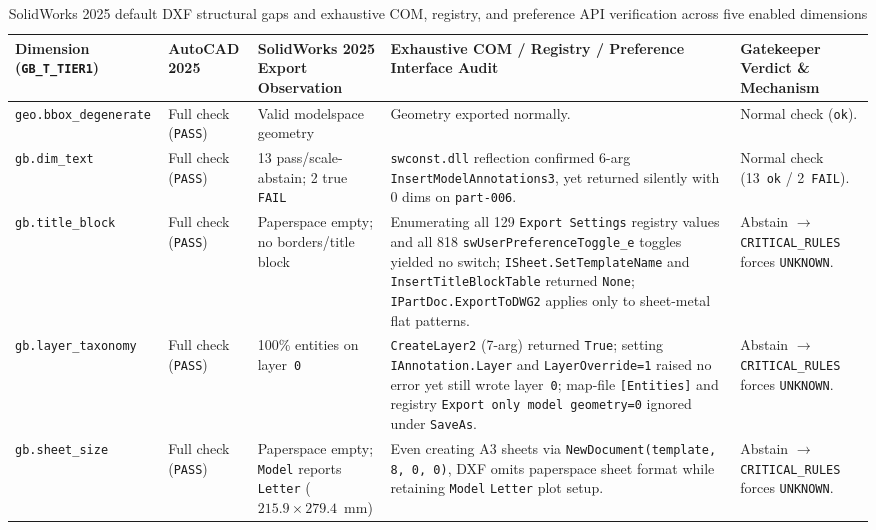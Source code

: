 \documentclass[nocopyright,nolists,upint,varvw,hyphenate]{asmejour}
\begin{document}
\begin{table}[t]
\caption{SolidWorks 2025 default DXF structural gaps and exhaustive COM, registry, and preference API verification across five enabled dimensions}\label{tab:supp_sw_audit}
\centering
\scriptsize
\setlength{\tabcolsep}{2.5pt}
%
\begin{tabularx}{\textwidth}{L{2.1cm} L{1.9cm} L{3.0cm} Y L{2.9cm}}
\toprule
Dimension (\texttt{GB\_T\_TIER1}) & AutoCAD 2025 & SolidWorks 2025 Export Observation & Exhaustive COM / Registry / Preference Interface Audit & Gatekeeper Verdict \& Mechanism \\
\midrule
\texttt{geo.bbox\_degenerate} & Full check (\texttt{PASS}) & Valid modelspace geometry & Geometry exported normally. & Normal check (\texttt{ok}). \\
\addlinespace[2pt]
\texttt{gb.dim\_text} & Full check (\texttt{PASS}) & 13 pass/scale-abstain; 2 true \texttt{FAIL} & \texttt{swconst.dll} reflection confirmed 6-arg \texttt{InsertModelAnnotations3}, yet returned silently with 0 dims on \texttt{part-006}. & Normal check (13~\texttt{ok} / 2~\texttt{FAIL}). \\
\addlinespace[2pt]
\texttt{gb.title\_block} & Full check (\texttt{PASS}) & Paperspace empty; no borders/title block & Enumerating all 129 \texttt{Export Settings} registry values and all 818 \texttt{swUserPreferenceToggle\_e} toggles yielded no switch; \texttt{ISheet.SetTemplateName} and \texttt{InsertTitleBlockTable} returned \texttt{None}; \texttt{IPartDoc.ExportToDWG2} applies only to sheet-metal flat patterns. & Abstain $\to$ \texttt{CRITICAL\_RULES} forces \texttt{UNKNOWN}. \\
\addlinespace[2pt]
\texttt{gb.layer\_taxonomy} & Full check (\texttt{PASS}) & 100\% entities on layer~\texttt{0} & \texttt{CreateLayer2} (7-arg) returned \texttt{True}; setting \texttt{IAnnotation.Layer} and \texttt{LayerOverride=1} raised no error yet still wrote layer~\texttt{0}; map-file \texttt{[Entities]} and registry \texttt{Export only model geometry=0} ignored under \texttt{SaveAs}. & Abstain $\to$ \texttt{CRITICAL\_RULES} forces \texttt{UNKNOWN}. \\
\addlinespace[2pt]
\texttt{gb.sheet\_size} & Full check (\texttt{PASS}) & Paperspace empty; \texttt{Model} reports \texttt{Letter} ($215.9{\times}279.4$~mm) & Even creating A3 sheets via \texttt{NewDocument(template, 8, 0, 0)}, DXF omits paperspace sheet format while retaining \texttt{Model} \texttt{Letter} plot setup. & Abstain $\to$ \texttt{CRITICAL\_RULES} forces \texttt{UNKNOWN}. \\
\bottomrule
\end{tabularx}
\end{table}
\end{document}
